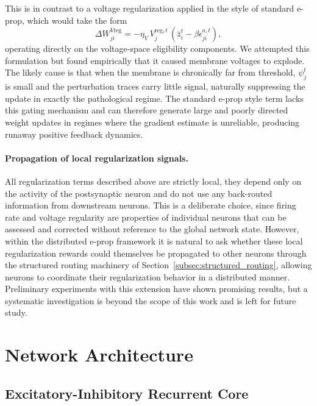     This is in contrast to a voltage regularization applied in the style of standard
    e-prop, which would take the form
    \[
        \Delta W_{ji}^{V\text{reg}} = -\eta_V\,
        V_j^{\mathrm{reg},t}\,
        \left( \bar{z}_i^t - \beta \epsilon_{ji}^{a,t} \right),
    \]
    operating directly on the voltage-space eligibility components. We attempted this
    formulation but found empirically that it caused membrane voltages to explode. The likely cause is that when the membrane is chronically far from
    threshold, $\psi_j^t$ is small and the perturbation traces carry little signal,
    naturally suppressing the update in exactly the pathological regime. The standard
    e-prop style term lacks this gating mechanism and can therefore generate large and
    poorly directed weight updates in regimes where the gradient estimate is unreliable,
    producing runaway positive feedback dynamics.
    
    \paragraph{Propagation of local regularization signals.}
    
    All regularization terms described above are strictly local, they depend only on the
    activity of the postsynaptic neuron and do not use any back-routed information from
    downstream neurons. This is a deliberate choice, since firing rate and voltage
    regularity are properties of individual neurons that can be assessed and corrected
    without reference to the global network state. However, within the distributed e-prop
    framework it is natural to ask whether these local regularization rewards could
    themselves be propagated to other neurons through the structured routing machinery of
    Section~\ref{subsec:structured_routing}, allowing neurons to coordinate their regularization
    behavior in a distributed manner. Preliminary experiments with this extension have
    shown promising results, but a systematic investigation is beyond the scope of this
    work and is left for future study.
    
\section{Network Architecture}
\label{sec:network-architecture}

\subsection{Excitatory-Inhibitory Recurrent Core}
\label{sec:ei_core}

